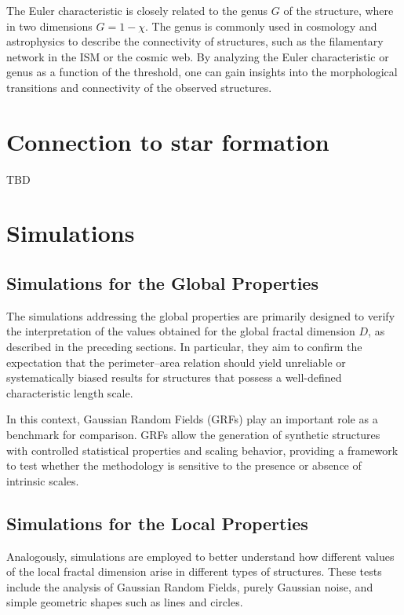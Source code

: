 The Euler characteristic is closely related to the genus $G$ of the structure, where in two dimensions $G = 1 - \chi$. The genus is commonly used in cosmology and astrophysics to describe the connectivity of structures, such as the filamentary network in the ISM or the cosmic web. By analyzing the Euler characteristic or genus as a function of the threshold, one can gain insights into the morphological transitions and connectivity of the observed structures.

\section{Connection to star formation}

TBD

\section{Simulations}

\subsection{Simulations for the Global Properties}

The simulations addressing the global properties are primarily designed to verify the interpretation of the values obtained for the global fractal dimension $D$, as described in the preceding sections. In particular, they aim to confirm the expectation that the perimeter–area relation should yield unreliable or systematically biased results for structures that possess a well-defined characteristic length scale. 

In this context, Gaussian Random Fields (GRFs) play an important role as a benchmark for comparison. GRFs allow the generation of synthetic structures with controlled statistical properties and scaling behavior, providing a framework to test whether the methodology is sensitive to the presence or absence of intrinsic scales.

\subsection{Simulations for the Local Properties}

Analogously, simulations are employed to better understand how different values of the local fractal dimension arise in different types of structures. These tests include the analysis of Gaussian Random Fields, purely Gaussian noise, and simple geometric shapes such as lines and circles. 

